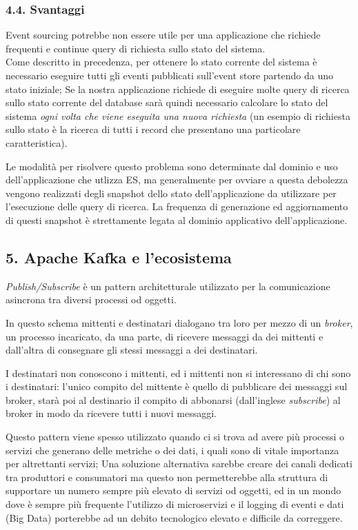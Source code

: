 \documentclass[]{article}
\begin{document}
\newpage

\subsubsection{4.4. Svantaggi}\label{svantaggi}

Event sourcing potrebbe non essere utile per una applicazione che
richiede frequenti e continue query di richiesta sullo stato del
sistema.\\
Come descritto in precedenza, per ottenere lo stato corrente del sistema
è necessario eseguire tutti gli eventi pubblicati sull'event store
partendo da uno stato iniziale; Se la nostra applicazione richiede di
eseguire molte query di ricerca sullo stato corrente del database sarà
quindi necessario calcolare lo stato del sistema \emph{ogni volta che
viene eseguita una nuova richiesta} (un esempio di richiesta sullo stato
è la ricerca di tutti i record che presentano una particolare
caratteristica).

Le modalità per risolvere questo problema sono determinate dal dominio e
uso dell'applicazione che utlizza ES, ma generalmente per ovviare a
questa debolezza vengono realizzati degli snapshot dello stato
dell'applicazione da utilizzare per l'esecuzione delle query di ricerca.
La frequenza di generazione ed aggiornamento di questi snapshot è
strettamente legata al dominio applicativo dell'applicazione.

\newpage

\subsection{5. Apache Kafka e
l'ecosistema}\label{apache-kafka-e-lecosistema}

\emph{Publish/Subscribe} è un pattern architetturale utilizzato per la
comunicazione asincrona tra diversi processi od oggetti.

In questo schema mittenti e destinatari dialogano tra loro per mezzo di
un \emph{broker}, un processo incaricato, da una parte, di ricevere
messaggi da dei mittenti e dall'altra di consegnare gli stessi messaggi
a dei destinatari.

I destinatari non conoscono i mittenti, ed i mittenti non si interessano
di chi sono i destinatari: l'unico compito del mittente è quello di
pubblicare dei messaggi sul broker, starà poi al destinario il compito
di abbonarsi (dall'inglese \emph{subscribe}) al broker in modo da
ricevere tutti i nuovi messaggi.

Questo pattern viene spesso utilizzato quando ci si trova ad avere più
processi o servizi che generano delle metriche o dei dati, i quali sono
di vitale importanza per altrettanti servizi; Una soluzione alternativa
sarebbe creare dei canali dedicati tra produttori e consumatori ma
questo non permetterebbe alla struttura di supportare un numero sempre
più elevato di servizi od oggetti, ed in un mondo dove è sempre più
frequente l'utilizzo di microservizi e il logging di eventi e dati (Big
Data) porterebbe ad un debito tecnologico elevato e difficile da
correggere.
\end{document}

